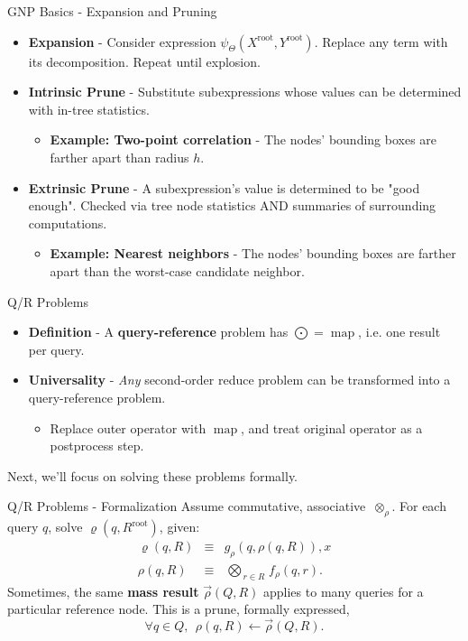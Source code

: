 \documentclass[pdf,colorBG,slideColor]{prosper}
\newcommand{\itemt}[1]{\item {\bf #1} -}
\DeclareMathOperator*{\map}{map}
\newcommand{\gnp}{\psi_{\Theta}}
\newcommand{\defterm}[1]{{\bf #1}}
\newcommand{\kdroot}[1]{#1^{\text{root}}}
\newcommand{\nameOp}[2]{\mathop{#1\nolimits\!\!_{#2}}}
\newcommand{\nameop}[2]{{\scriptstyle\:}#1_{\!#2}}
\newcommand{\myOp}[1]{\nameOp{\bigotimes}{#1}}
\newcommand{\myop}[1]{\nameop{\otimes}{#1}}
\newcommand{\letterqr}{\rho}
\newcommand{\outqr}{\varrho}
\newcommand{\inqr}{\rho}
\newcommand{\Opqr}{\myOp{\letterqr}}
\newcommand{\opqr}{\myop{\letterqr}}
\newcommand{\fqr}{f_{\!\letterqr}}
\newcommand{\gqr}{g_{\!\letterqr}}
\newcommand{\inqrv}{\vec{\rho}}
\begin{document}
\begin{slide}{GNP Basics - Expansion and Pruning}
  \begin{itemize}
    \itemt{Expansion}
    Consider expression $\gnp(\kdroot{X}, \kdroot{Y})$.
    Replace any term with its decomposition.
    Repeat until explosion.
    \itemt{Intrinsic Prune}
    Substitute subexpressions whose values can be determined with
    in-tree statistics.
    \begin{itemize}
      \itemt{Example: Two-point correlation} The nodes' bounding boxes are
      farther apart than radius $h$.
    \end{itemize}
    \itemt{Extrinsic Prune}
    A subexpression's value is determined to be "good enough".
    Checked via tree node statistics AND summaries of surrounding computations.
    \begin{itemize}
      \itemt{Example: Nearest neighbors}
      The nodes' bounding boxes are farther apart than the
      worst-case candidate neighbor.
    \end{itemize}
  \end{itemize}
\end{slide}

\begin{slide}{Q/R Problems}
  \begin{itemize}
    \itemt{Definition} A \defterm{query-reference} problem has $\bigodot = \map$, i.e. one result per query.
    \itemt{Universality} {\it Any} second-order reduce problem can be transformed into a query-reference problem.
    \begin{itemize} \item
      Replace outer operator with $\map$, and treat original operator as a postprocess step.
    \end{itemize}
  \end{itemize}
  Next, we'll focus on solving these problems formally.
\end{slide}

\begin{slide}{Q/R Problems - Formalization}
  Assume commutative, associative $\opqr$.
  For each query $q$, solve $\outqr(q, \kdroot{R})$, given:
  \begin{eqnarray*}
    \outqr(q, R) &\equiv& \gqr(q, \inqr(q, R)),
x    \\
    \inqr(q, R) &\equiv& \Opqr_{r \in R} \fqr(q, r).
  \end{eqnarray*}
  Sometimes, the same \defterm{mass result} $\inqrv(Q, R)$
  applies to many queries for a particular reference node.
  This is a prune, formally expressed,
  \[
  \forall q \in Q,~~ \inqr(q, R) \gets \inqrv(Q, R).
  \]
\end{slide}
\end{document}
